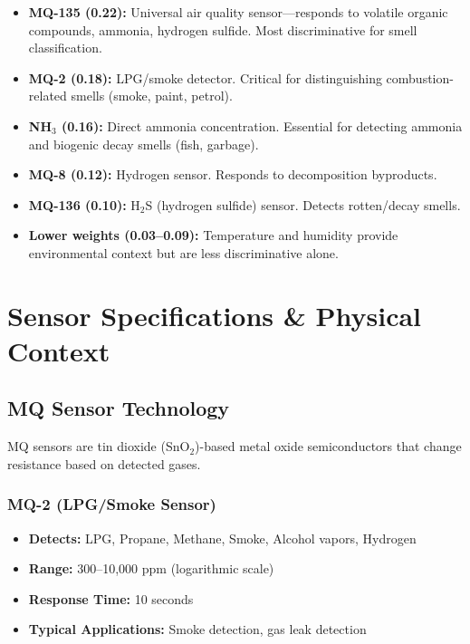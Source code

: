 \documentclass[10pt]{article}
\begin{document}
\begin{itemize}
    \item \textbf{MQ-135 (0.22):} Universal air quality sensor—responds to volatile organic compounds, ammonia, hydrogen sulfide. Most discriminative for smell classification.
    
    \item \textbf{MQ-2 (0.18):} LPG/smoke detector. Critical for distinguishing combustion-related smells (smoke, paint, petrol).
    
    \item \textbf{NH$_3$ (0.16):} Direct ammonia concentration. Essential for detecting ammonia and biogenic decay smells (fish, garbage).
    
    \item \textbf{MQ-8 (0.12):} Hydrogen sensor. Responds to decomposition byproducts.
    
    \item \textbf{MQ-136 (0.10):} H$_2$S (hydrogen sulfide) sensor. Detects rotten/decay smells.
    
    \item \textbf{Lower weights (0.03–0.09):} Temperature and humidity provide environmental context but are less discriminative alone.
\end{itemize}


\section{Sensor Specifications \& Physical Context}

\subsection{MQ Sensor Technology}

MQ sensors are tin dioxide (SnO$_2$)-based metal oxide semiconductors that change resistance based on detected gases.

\subsubsection{MQ-2 (LPG/Smoke Sensor)}

\begin{itemize}
    \item \textbf{Detects:} LPG, Propane, Methane, Smoke, Alcohol vapors, Hydrogen
    \item \textbf{Range:} 300–10,000 ppm (logarithmic scale)
    \item \textbf{Response Time:} 10 seconds
    \item \textbf{Typical Applications:} Smoke detection, gas leak detection
\end{itemize}
\end{document}
